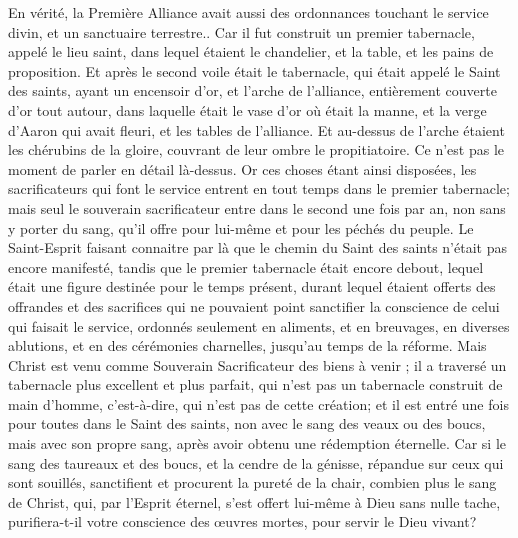 \begin{multicols}{2}
\VerseOne{}En vérité, la Première Alliance avait aussi des ordonnances touchant le service divin, et un sanctuaire terrestre..
Car il fut construit un premier tabernacle, appelé le lieu saint, dans lequel étaient le chandelier, et la table, et les pains de proposition.
Et après le second voile était le tabernacle, qui était appelé le Saint des saints,
ayant un encensoir d'or, et l'arche de l'alliance, entièrement couverte d'or tout autour, dans laquelle était le vase d'or où était la manne, et la verge d'Aaron qui avait fleuri, et les tables de l'alliance.
Et au-dessus de l'arche étaient les chérubins de la gloire, couvrant de leur ombre le propitiatoire. Ce n'est pas le moment de parler en détail là-dessus.
Or ces choses étant ainsi disposées, les sacrificateurs qui font le service entrent en tout temps dans le premier tabernacle;
mais seul le souverain sacrificateur entre dans le second une fois par an, non sans y porter du sang, qu'il offre pour lui-même et pour les péchés du peuple.
Le Saint-Esprit faisant connaitre par là que le chemin du Saint des saints n'était pas encore manifesté, tandis que le premier tabernacle était encore debout,
lequel était une figure destinée pour le temps présent, durant lequel étaient offerts des offrandes et des sacrifices qui ne pouvaient point sanctifier la conscience de celui qui faisait le service,
ordonnés seulement en aliments, et en breuvages, en diverses ablutions, et en des cérémonies charnelles, jusqu'au temps de la réforme.
Mais Christ est venu comme Souverain Sacrificateur des biens à venir ; il a traversé un tabernacle plus excellent et plus parfait, qui n'est pas un tabernacle construit de main d'homme, c'est-à-dire, qui n'est pas de cette création;
et il est entré une fois pour toutes dans le Saint des saints, non avec le sang des veaux ou des boucs, mais avec son propre sang, après avoir obtenu une rédemption éternelle.
Car si le sang des taureaux et des boucs, et la cendre de la génisse, répandue sur ceux qui sont souillés, sanctifient et procurent la pureté de la chair,
combien plus le sang de Christ, qui, par l'Esprit éternel, s'est offert lui-même à Dieu sans nulle tache, purifiera-t-il votre conscience des œuvres mortes, pour servir le Dieu vivant?

\end{multicols}
